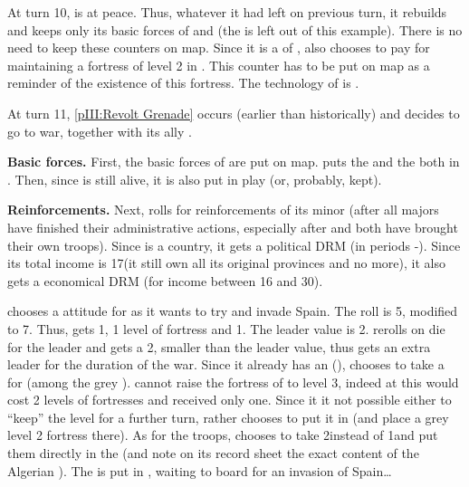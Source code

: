 \begin{exemple}
  At turn 10, \paysAlgerie is at peace. Thus, whatever it had left on previous
  turn, it rebuilds and keeps only its basic forces of \ARMY\facemoins and
  \FLEET\facemoins (the \corsaire is left out of this example). There is no
  need to keep these counters on map. Since it is a \VASSAL of \TUR, \TUR also
  chooses to pay for maintaining a fortress of level 2 in
  \provinceAlgerie. This counter has to be put on map as a reminder of the
  existence of this fortress. The technology of \paysAlgerie is \TREN.

  At turn 11, \ref{pIII:Revolt Grenade} occurs (earlier than historically) and
  \TUR decides to go to war, together with its ally \paysAlgerie.

  \textbf{Basic forces.} First, the basic forces of \paysAlgerie are put on
  map. \TUR puts the \ARMY\facemoins and the \FLEET\facemoins both in
  \provinceAlgerie. Then, since  is still alive, it is also
  put in play (or, probably, kept).

  \textbf{Reinforcements.} Next, \TUR rolls for reinforcements of its minor
  (after all majors have finished their administrative actions, especially
  after \TUR and \HIS both have brought their own troops). Since \paysAlgerie
  is a  country, it gets a  political DRM (in
  periods -). Since its total income is 17\ducats (it
  still own all its original provinces and no more), it also gets a 
  economical DRM (for income between 16 and 30\ducats).

  \TUR chooses a  attitude for \paysAlgerie as it wants to try
  and invade Spain. The roll is 5, modified to 7. Thus, \paysAlgerie gets
  1\LD, 1 level of fortress and 1\ND. The leader value is 2. \TUR rerolls on
  die for the leader and gets a 2, smaller than the leader value, thus
  \paysAlgerie gets an extra leader for the duration of the war. Since it
  already has an \LeaderA (), \TUR chooses to take a
  \LeaderG for \paysAlgerie (among the grey \anonyme\LeaderG). \TUR cannot
  raise the fortress of \provinceAlgerie to level 3, indeed at \TREN this
  would cost 2 levels of fortresses and \paysAlgerie received only one. Since
  it it not possible either to ``keep'' the level for a further turn, \TUR
  rather chooses to put it in \provinceOran (and place a grey level 2 fortress
  there). As for the troops, \TUR chooses to take 2\NGD instead of 1\ND and
  put them directly in the \FLEET (and note on its record sheet the exact
  content of the Algerian \FLEET). The \LD is put in \provinceAlgerie, waiting
  to board for an invasion of Spain\ldots
\end{exemple}

